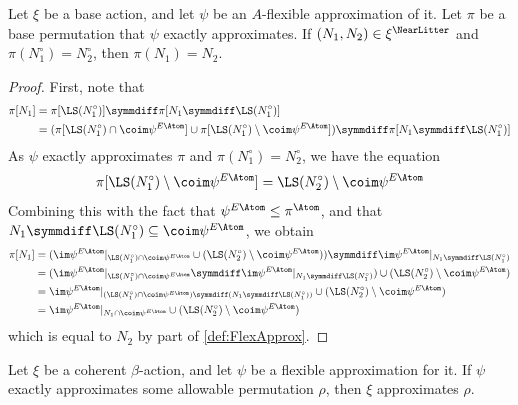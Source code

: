 \begin{proposition}
  \label{prop:FlexApprox.smul_nearLitter_eq}
  \leanok
  Let \( \xi \) be a base action, and let \( \psi \) be an \( A \)-flexible approximation of it.
  Let \( \pi \) be a base permutation that \( \psi \) exactly approximates.
  If \( (N_1, N_2) \in \xi^\NearLitter \) and \( \pi(N_1^\circ) = N_2^\circ \), then \( \pi(N_1) = N_2 \).
\end{proposition}
\begin{proof}
  \leanok
  First, note that
  \begin{align*}
    \pi[N_1] &= \pi[\LS(N_1^\circ)] \symmdiff \pi[N_1 \symmdiff \LS(N_1^\circ)] \\
    &= (\pi[\LS(N_1^\circ) \cap \coim \psi^{E\Atom}] \cup \pi[\LS(N_1^\circ) \setminus \coim \psi^{E\Atom}]) \symmdiff \pi[N_1 \symmdiff \LS(N_1^\circ)]
  \end{align*}
  As \( \psi \) exactly approximates \( \pi \) and \( \pi(N_1^\circ) = N_2^\circ \), we have the equation
  \[ \pi[\LS(N_1^\circ) \setminus \coim \psi^{E\Atom}] = \LS(N_2^\circ) \setminus \coim \psi^{E\Atom} \]
  Combining this with the fact that \( \psi^{E\Atom} \leq \pi^\Atom \), and that \( N_1 \symmdiff \LS(N_1^\circ) \subseteq \coim \psi^{E\Atom} \), we obtain
  \begin{align*}
    \pi[N_1]
    &= (\im \psi^{E\Atom}|_{\LS(N_1^\circ) \cap \coim \psi^{E\Atom}} \cup (\LS(N_2^\circ) \setminus \coim \psi^{E\Atom})) \symmdiff \im \psi^{E\Atom}|_{N_1 \symmdiff \LS(N_1^\circ)} \\
    &= (\im \psi^{E\Atom}|_{\LS(N_1^\circ) \cap \coim \psi^{E\Atom}} \symmdiff \im \psi^{E\Atom}|_{N_1 \symmdiff \LS(N_1^\circ)})  \cup (\LS(N_2^\circ) \setminus \coim \psi^{E\Atom}) \\
    &= \im \psi^{E\Atom}|_{(\LS(N_1^\circ) \cap \coim \psi^{E\Atom}) \symmdiff (N_1 \symmdiff \LS(N_1^\circ))} \cup (\LS(N_2^\circ) \setminus \coim \psi^{E\Atom}) \\
    &= \im \psi^{E\Atom}|_{N_1 \cap \coim \psi^{E\Atom}} \cup (\LS(N_2^\circ) \setminus \coim \psi^{E\Atom})
  \end{align*}
  which is equal to \( N_2 \) by part of \cref{def:FlexApprox}.
\end{proof}
\begin{proposition}
  \label{prop:approximates_of_flexApprox}
  \leanok
  Let \( \xi \) be a coherent \( \beta \)-action, and let \( \psi \) be a flexible approximation for it.
  If \( \psi \) exactly approximates some allowable permutation \( \rho \), then \( \xi \) approximates \( \rho \).
\end{proposition}
